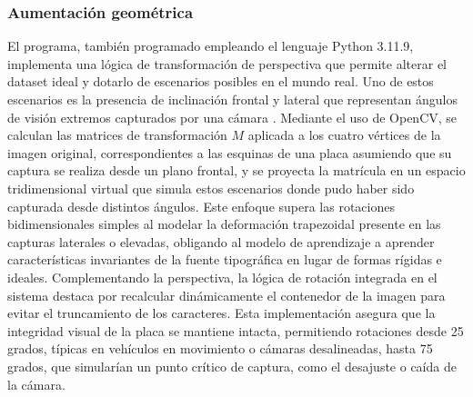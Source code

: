 \subsubsection*{Aumentación geométrica}
El programa, también programado empleando el lenguaje Python 3.11.9, implementa una lógica de transformación de perspectiva que permite alterar el dataset ideal y dotarlo de escenarios posibles en el mundo real. Uno de estos escenarios es la presencia de inclinación frontal y lateral que representan ángulos de visión extremos capturados por una cámara \cite{zhou-lu2023}. Mediante el uso de OpenCV, se calculan las matrices de transformación $M$ aplicada a los cuatro vértices de la imagen original, correspondientes a las esquinas de una placa asumiendo que su captura se realiza desde un plano frontal, y se proyecta la matrícula en un espacio tridimensional virtual que simula estos escenarios donde pudo haber sido capturada desde distintos ángulos. Este enfoque supera las rotaciones bidimensionales simples al modelar la deformación trapezoidal presente en las capturas laterales o elevadas, obligando al modelo de aprendizaje a aprender características invariantes de la fuente tipográfica en lugar de formas rígidas e ideales. Complementando la perspectiva, la lógica de rotación integrada en el sistema destaca por recalcular dinámicamente el contenedor de la imagen para evitar el truncamiento de los caracteres. Esta implementación asegura que la integridad visual de la placa se mantiene intacta, permitiendo rotaciones desde 25 grados, típicas en vehículos en movimiento o cámaras desalineadas, hasta 75 grados, que simularían un punto crítico de captura, como el desajuste o caída de la cámara.%

